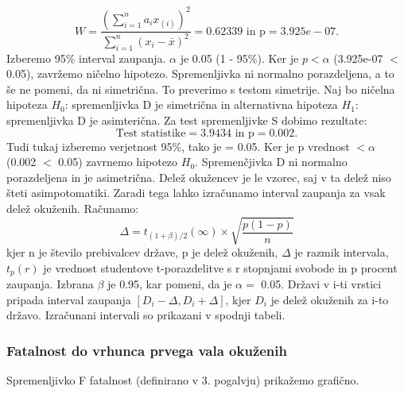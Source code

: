 \documentclass[a4paper,11pt]{article}
\begin{document}
\[W = \frac{(\sum_{i = 1}^{n}a_i x_{(i)})^2}{\sum_{i = 1}^{n}(x_i - \overset{\_}{x})^2} = 0.62339 \text{ in p} = 3.925e-07. \]
Izberemo 95\% interval zaupanja. \(\alpha\) je 0.05 (1 - 95\%). Ker je \(p < \alpha\) (3.925e-07 \(<\) 0.05), zavržemo ničelno hipotezo. Spremenljivka ni normalno porazdeljena, a to še ne pomeni, da ni simetrična. To preverimo s testom simetrije. Naj bo ničelna hipoteza \(H_0\): spremenljivka D je simetrična in alternativna hipoteza \(H_1\): spremenljivka D je asimterična. Za test spremenljivke S dobimo rezultate:
\[\text{Test statistike} = 3.9434 \text{ in p} =  0.002.\]
Tudi tukaj izberemo verjetnost 95\%, tako je \alpha = 0.05. Ker je p vrednost \(< \alpha\) (0.002 \(<\) 0.05) zavrnemo hipotezo \(H_0\). Spremenčjivka D ni normalno porazdeljena in je asimetrična. Delež okužencev je le vzorec, saj v ta delež niso šteti asimpotomatiki. Zaradi tega lahko izračunamo interval zaupanja za vsak delež okuženih. Računamo:
\[\Delta = t_{(1 + \beta) /2}(\infty) \times \sqrt{\frac{p(1 - p)}{n}}\]
kjer n je število prebivalcev države, p je delež okuženih, \(\Delta\) je razmik intervala, \(t_{p}(r)\) je vrednost studentove t-porazdelitve s r stopnjami svobode in p procent zaupanja. Izbrana \(\beta\) je 0.95, kar pomeni, da je \(\alpha = \) 0.05. Državi v i-ti vrstici pripada interval zaupanja \([D_i - \Delta, D_i + \Delta]\), kjer \(D_i\) je delež okuženih za i-to državo. Izračunani intervali so prikazani v spodnji tabeli.
\begin{center}
\end{center}

\subsubsection{Fatalnost do vrhunca prvega vala okuženih}
Spremenljivko F fatalnost (definirano v 3. pogalvju) prikažemo grafično.
\end{document}
